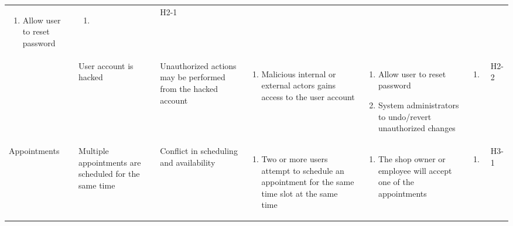 \documentclass{article}
\begin{document}
\begin{landscape}
\begin{longtable}{|p{}|p{}|p{}|p{}|p{}|p{}|p{}|}
\begin{enumerate}[label=\alph*., leftmargin=*]
			   \item Allow user to reset password
		   \end{enumerate}
		 & \begin{enumerate}[label=\alph*., leftmargin=*]
			   \item
		   \end{enumerate}
		 & H2-1                                                                                                         \\
		\cline{2-7}
		 & User account is hacked
		 & Unauthorized actions may be performed from the hacked account
		 & \begin{enumerate}[label=\alph*., leftmargin=*]
			   \item Malicious internal or external actors gains access to the user account
		   \end{enumerate}
		 & \begin{enumerate}[label=\alph*., leftmargin=*]
			   \item Allow user to reset password
			   \item System administrators to undo/revert unauthorized changes
		   \end{enumerate}
		 & \begin{enumerate}[label=\alph*., leftmargin=*]
			   \item
		   \end{enumerate}
		 & H2-2                                                                                                         \\
		\hline
		Appointments
		 & Multiple appointments are scheduled for the same time
		 & Conflict in scheduling and availability
		 & \begin{enumerate}[label=\alph*., leftmargin=*]
			   \item Two or more users attempt to schedule an appointment for the same time slot at the same time
		   \end{enumerate}
		 & \begin{enumerate}[label=\alph*., leftmargin=*]
			   \item The shop owner or employee will accept one of the appointments
		   \end{enumerate}
		 & \begin{enumerate}[label=\alph*., leftmargin=*]
			   \item
		   \end{enumerate}
		 & H3-1                                                                                                         \\

\end{longtable}
\end{landscape}
\end{document}
